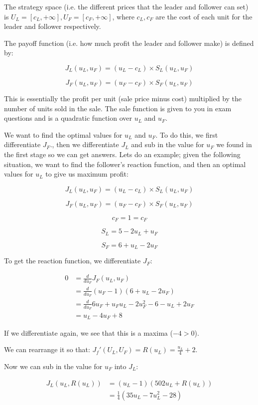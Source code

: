 The strategy space (i.e. the different prices that the leader and follower can
set) is $U_L = [c_L, +\infty], U_F = [c_F, +\infty]$, where $c_L, c_F$ are the
cost of each unit for the leader and follower respectively.

The payoff function (i.e. how much profit the leader and follower make) is
defined by:

\[
  J_L(u_L, u_F) = (u_L - c_L) \times S_L(u_L, u_F)
\]

\[
  J_F(u_L, u_F) = (u_F - c_F) \times S_F(u_L, u_F)
\]

This is essentially the profit per unit (sale price minus cost) multiplied by
the number of units sold in the sale. The sale function is given to you in exam
questions and is a quadratic function over $u_L$ and $u_F$.

We want to find the optimal values for $u_L$ and $u_F$. To do this, we
first differentiate $J_F$., then we differentiate $J_L$ and sub in the
value for $u_F$ we found in the first stage so we can get
answers. Lets do an example; given the following situation, we want to
find the follower's reaction function, and then an optimal values for
$u_L$ to give us maximum profit:

\[
  J_L(u_L, u_F) = (u_L - c_L) \times S_L(u_L, u_F)
\]

\[
  J_F(u_L, u_F) = (u_F - c_F) \times S_F(u_L, u_F)
\]

\[
  c_F = 1 = c_F
\]

\[
  S_L =  5 - 2u_L + u_F
\]

\[
  S_F = 6 + u_L - 2u_F
\]

To get the reaction function, we differentiate $J_F$:

\[
  \begin{split}
    0 &= \frac{d}{du_F}J_F(u_L,u_F)\\
      &= \frac{d}{du_F}(u_F - 1)(6 + u_L - 2u_F)\\
      &= \frac{d}{du_F}6u_F + u_Fu_L - 2u_F^2 - 6 - u_L + 2u_F\\
      &= u_L - 4u_F + 8
  \end{split}
\]

If we differentiate again, we see that this is a maxima ($-4 > 0$).

We can rearrange it so that: $J_f'(U_L,U_F) = R(u_L) = \frac{u_L}{4} + 2$.

Now we can sub in the value for $u_F$ into $J_L$:

\[
  \begin{split}
    J_L(u_L, R(u_L)) &= (u_L - 1)(5 0 2u_L + R(u_L))\\
                     &= \frac{1}{4}(35u_L - 7u_L^2 - 28)
  \end{split}
\]

